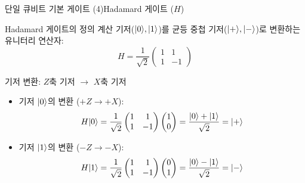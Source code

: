 \documentclass[aspectratio=169, 10pt]{beamer}
\begin{document}
\begin{frame}{단일 큐비트 기본 게이트 (4)}{Hadamard 게이트 ($H$)}
    \begin{block}{Hadamard 게이트의 정의}
        계산 기저($|0\rangle, |1\rangle$)를 균등 중첩 기저($|+\rangle, |-\rangle$)로 변환하는 유니터리 연산자:
        $$H = \frac{1}{\sqrt{2}}\begin{pmatrix} 1 & 1 \\ 1 & -1 \end{pmatrix}$$
    \end{block} \pause
    \vspace{0.15cm}
    \begin{block}{기저 변환: $Z$축 기저 $\to$ $X$축 기저}
        \begin{itemize}
            \item 기저 $|0\rangle$의 변환 ($+Z \to +X$):
            $$H|0\rangle = \frac{1}{\sqrt{2}}\begin{pmatrix} 1 & 1 \\ 1 & -1 \end{pmatrix}\begin{pmatrix} 1 \\ 0 \end{pmatrix} = \frac{|0\rangle+|1\rangle}{\sqrt{2}} = |+\rangle$$ \pause
            \item 기저 $|1\rangle$의 변환 ($-Z \to -X$):
            $$H|1\rangle = \frac{1}{\sqrt{2}}\begin{pmatrix} 1 & 1 \\ 1 & -1 \end{pmatrix}\begin{pmatrix} 0 \\ 1 \end{pmatrix} = \frac{|0\rangle-|1\rangle}{\sqrt{2}} = |-\rangle$$
        \end{itemize}
    \end{block}
\end{frame}
\end{document}
